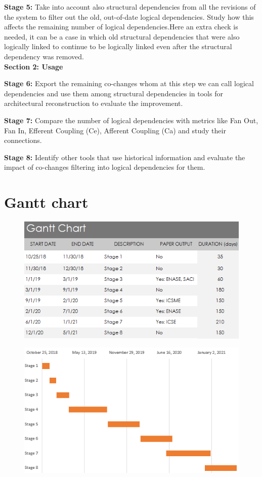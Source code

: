 \documentclass[12pt]{mitthesis}
\begin{document}
\textbf{Stage 5:} Take into account also structural dependencies from all the revisions of the system to filter out the old, out-of-date logical dependencies. 
Study how this affects the remaining number of logical dependencies.Here an extra check is needed, it can be a case in which old structural dependencies that were also logically linked to continue to be logically linked
even after the structural dependency was removed.\\


\textbf{Section 2: Usage}

\textbf{Stage 6:} Export the remaining co-changes whom at this step we can call logical dependencies and use them among structural dependencies in tools for architectural reconstruction to evaluate the improvement.

\textbf{Stage 7:} Compare the number of logical dependencies with metrics like Fan Out, Fan In, Efferent Coupling (Ce), Afferent Coupling (Ca) and study their connections.

\textbf{Stage 8:} Identify other tools that use historical information and evaluate the impact of co-changes filtering into logical dependencies for them. 

\section{Gantt chart}

\begin{figure}[H]
\centering
\includegraphics[width=\textwidth]{gantt_chart.PNG}
\label{fig:gantt1}
\end{figure}

\begin{figure}[H]
\centering
\includegraphics[width=\textwidth]{gantt_plot.PNG}
\label{fig:gantt2}
\end{figure}
\end{document}
